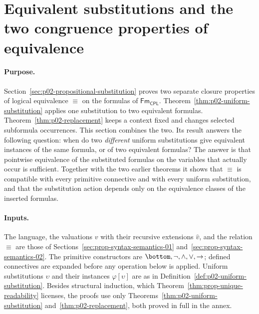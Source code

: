 \section{Equivalent substitutions and the two congruence properties of equivalence}
\label{sec:p02-w02-p02-004-equivalent-substitutions}

\paragraph{Purpose.}
Section~\ref{sec:p02-propositional-substitution} proves two separate closure
properties of logical equivalence \(\equiv\) on the formulas of
\(\mathsf{Fm}_{\mathsf{CPL}}\).  Theorem~\ref{thm:p02-uniform-substitution}
applies one substitution to two equivalent formulas.
Theorem~\ref{thm:p02-replacement} keeps a context fixed and changes selected
subformula occurrences.  This section combines the two.  Its result answers
the following question: when do two \emph{different} uniform substitutions
give equivalent instances of the same formula, or of two equivalent formulas?
The answer is that pointwise equivalence of the substituted formulas on the
variables that actually occur is sufficient.  Together with the two earlier
theorems it shows that \(\equiv\) is compatible with every primitive
connective and with every uniform substitution, and that the substitution
action depends only on the equivalence classes of the inserted formulas.

\paragraph{Inputs.}
The language, the valuations \(v\) with their recursive extensions
\(\widehat v\), and the relation \(\equiv\) are those of
Sections~\ref{sec:prop-syntax-semantics-01}
and~\ref{sec:prop-syntax-semantics-02}.  The primitive constructors are
\(\bottom,\neg,\land,\lor,\to\); defined connectives are expanded before any
operation below is applied.  Uniform substitutions \(\upsilon\) and their
instances \(\varphi[\upsilon]\) are as in
Definition~\ref{def:p02-uniform-substitution}.  Besides structural
induction, which Theorem~\ref{thm:prop-unique-readability} licenses, the
proofs use only
Theorems~\ref{thm:p02-uniform-substitution} and~\ref{thm:p02-replacement},
both proved in full in the annex.


